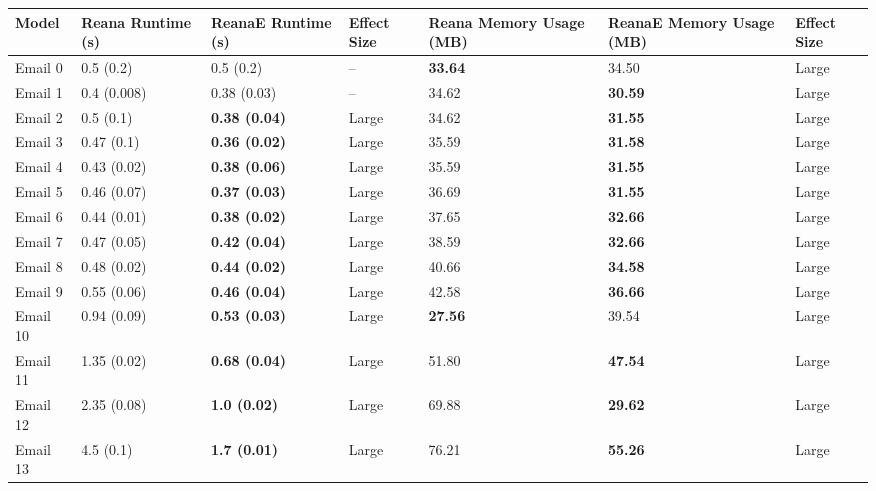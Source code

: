 \begin{tabular}{lllllll}
\toprule
   Model & Reana Runtime (s) &    ReanaE Runtime (s) & Effect Size & Reana Memory Usage (MB) & ReanaE Memory Usage (MB) & Effect Size \\
\midrule
 Email 0 &         0.5 (0.2) &             0.5 (0.2) &          -- &          \textbf{33.64} &                    34.50 &       Large \\
 Email 1 &       0.4 (0.008) &           0.38 (0.03) &          -- &                   34.62 &           \textbf{30.59} &       Large \\
 Email 2 &         0.5 (0.1) &  \textbf{0.38 (0.04)} &       Large &                   34.62 &           \textbf{31.55} &       Large \\
 Email 3 &        0.47 (0.1) &  \textbf{0.36 (0.02)} &       Large &                   35.59 &           \textbf{31.58} &       Large \\
 Email 4 &       0.43 (0.02) &  \textbf{0.38 (0.06)} &       Large &                   35.59 &           \textbf{31.55} &       Large \\
 Email 5 &       0.46 (0.07) &  \textbf{0.37 (0.03)} &       Large &                   36.69 &           \textbf{31.55} &       Large \\
 Email 6 &       0.44 (0.01) &  \textbf{0.38 (0.02)} &       Large &                   37.65 &           \textbf{32.66} &       Large \\
 Email 7 &       0.47 (0.05) &  \textbf{0.42 (0.04)} &       Large &                   38.59 &           \textbf{32.66} &       Large \\
 Email 8 &       0.48 (0.02) &  \textbf{0.44 (0.02)} &       Large &                   40.66 &           \textbf{34.58} &       Large \\
 Email 9 &       0.55 (0.06) &  \textbf{0.46 (0.04)} &       Large &                   42.58 &           \textbf{36.66} &       Large \\
Email 10 &       0.94 (0.09) &  \textbf{0.53 (0.03)} &       Large &          \textbf{27.56} &                    39.54 &       Large \\
Email 11 &       1.35 (0.02) &  \textbf{0.68 (0.04)} &       Large &                   51.80 &           \textbf{47.54} &       Large \\
Email 12 &       2.35 (0.08) &   \textbf{1.0 (0.02)} &       Large &                   69.88 &           \textbf{29.62} &       Large \\
Email 13 &         4.5 (0.1) &   \textbf{1.7 (0.01)} &       Large &                   76.21 &           \textbf{55.26} &       Large \\

\end{tabular}
